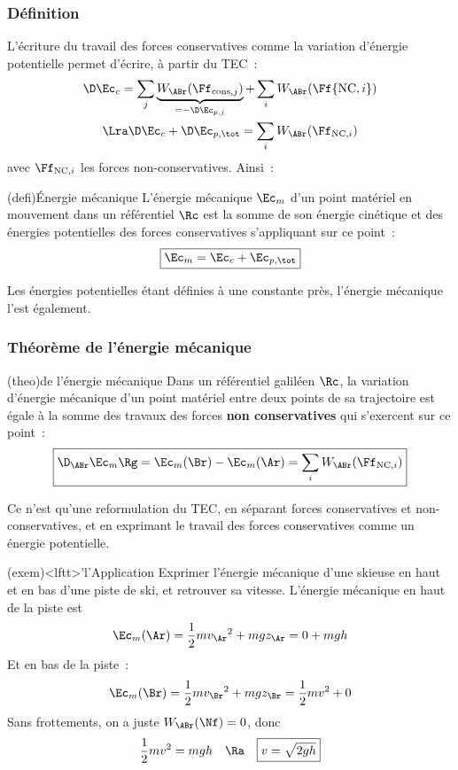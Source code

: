 \documentclass[../../main/main.tex]{subfiles}
\begin{document}
\subsubsection{Définition}

L'écriture du travail des forces conservatives comme la variation d'énergie
potentielle permet d'écrire, à partir du TEC~:
\begin{gather*}
	\D\Ec_c = \sum_j \underbrace{W_\ABr(\Ff_{{\rm cons},j})}_{=-\D\Ec_{p,j}}
	+ \sum_i W_\ABr(\Ff{{\rm NC}, i})
	\\\Lra
	\D\Ec_c + \D\Ec_{p,\tot} = \sum_i W_{\ABr}(\Ff_{{\rm NC},i})
\end{gather*}
avec $\Ff_{{\rm NC},i}$ les forces non-conservatives. Ainsi~:
\begin{tcb*}(defi){Énergie mécanique}
	L'énergie mécanique $\Ec_m$ d'un point matériel en mouvement dans un
	référentiel $\Rc$ est la somme de son énergie cinétique et des énergies
	potentielles des forces conservatives s'appliquant sur ce point~:
	\[\boxed{\Ec_m = \Ec_c + \Ec_{p, \tot}}\]
\end{tcb*}

Les énergies potentielles étant définies à une constante près, l'énergie
mécanique l'est également.

\subsubsection{Théorème de l'énergie mécanique}
\begin{tcb*}(theo){de l'énergie mécanique}
	Dans un référentiel galiléen $\Rc$, la variation d'énergie mécanique d'un
	point matériel entre deux points de sa trajectoire est égale à la somme des
	travaux des forces \textbf{non conservatives} qui s'exercent sur ce point~:
	\[\boxed{\D_{\ABr}\Ec_m\Rg = \Ec_m(\Br) - \Ec_m(\Ar) = \sum_i W_{\ABr}
			(\Ff_{{\rm NC},i})}\]
\end{tcb*}

Ce n'est qu'une reformulation du TEC, en séparant forces conservatives et
non-conservatives, et en exprimant le travail des forces conservatives comme un
énergie potentielle.

\begin{tcb*}(exem)<lftt>'l'{Application}
	Exprimer l'énergie mécanique d'une skieuse en haut et en bas d'une piste de
	ski, et retrouver sa vitesse.
	\tcblower
	L'énergie mécanique en haut de la piste est
	\[\Ec_m(\Ar) = \frac{1}{2}mv_{\Ar}{}^2 + mgz_{\Ar} = 0 + mgh\]
	Et en bas de la piste~:
	\[\Ec_m(\Br) = \frac{1}{2}mv_{\Br}{}^2 + mgz_{\Br} = \frac{1}{2}mv^2 + 0\]
	Sans frottements, on a juste $W_{\ABr}(\Nf) = 0$, donc
	\[\frac{1}{2}mv^2 = mgh\quad\Ra\quad\boxed{v=\sqrt{2gh}}\]
\end{tcb*}
\end{document}
